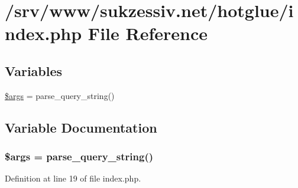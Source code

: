 \hypertarget{index_8php}{
\section{/srv/www/sukzessiv.net/hotglue/index.php File Reference}
\label{index_8php}
}
\subsection*{Variables}
\begin{DoxyCompactItemize}
\item 
\hyperlink{index_8php_a67e94494731d99ed23b123e95175bc10}{\$args} = parse\_\-query\_\-string()
\end{DoxyCompactItemize}


\subsection{Variable Documentation}
\hypertarget{index_8php_a67e94494731d99ed23b123e95175bc10}{
\subsubsection[{\$args}]{\setlength{\rightskip}{0pt plus 5cm}\$args = parse\_\-query\_\-string()}}
\label{index_8php_a67e94494731d99ed23b123e95175bc10}


Definition at line 19 of file index.php.

